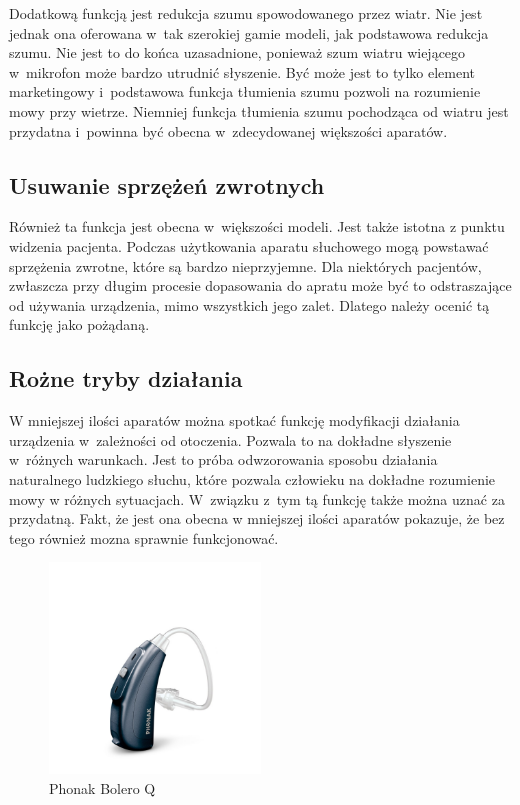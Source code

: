\documentclass[journal]{IEEEtran}
\begin{document}
Dodatkową funkcją jest redukcja szumu spowodowanego przez wiatr. Nie jest jednak ona oferowana w~tak szerokiej gamie modeli, jak podstawowa redukcja szumu. Nie jest to do końca uzasadnione, ponieważ szum wiatru wiejącego w~mikrofon może bardzo utrudnić słyszenie. Być może jest to tylko element marketingowy i~podstawowa funkcja tłumienia szumu pozwoli na rozumienie mowy przy wietrze. Niemniej funkcja tłumienia szumu pochodząca od wiatru jest przydatna i~powinna być obecna w~zdecydowanej większości aparatów.

\subsection{Usuwanie sprzężeń zwrotnych}

Również ta funkcja jest obecna w~większości modeli. Jest także istotna z punktu widzenia pacjenta. Podczas użytkowania aparatu słuchowego mogą powstawać sprzężenia zwrotne, które są bardzo nieprzyjemne. Dla niektórych pacjentów, zwłaszcza przy długim procesie dopasowania do apratu może być to odstraszające od używania urządzenia, mimo wszystkich jego zalet. Dlatego należy ocenić tą funkcję jako pożądaną. 

\subsection{Rożne tryby działania}

W mniejszej ilości aparatów można spotkać funkcję modyfikacji działania urządzenia w~zależności od otoczenia. Pozwala to na dokładne słyszenie w~różnych warunkach. Jest to próba odwzorowania sposobu działania naturalnego ludzkiego słuchu, które pozwala człowieku na dokładne rozumienie mowy w różnych sytuacjach. W~związku z~tym tą funkcję także można uznać za przydatną. Fakt, że jest ona obecna w mniejszej ilości aparatów pokazuje, że bez tego również mozna sprawnie funkcjonować.

\begin{figure}
    \includegraphics[width=0.5\textwidth]{phonak}
    \caption{Phonak Bolero Q}
    \label{fig:phonak}
\end{figure}
\end{document}

